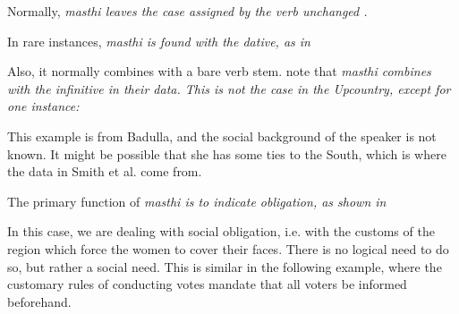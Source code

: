 Normally, \em masthi \em leaves the case assigned by the verb unchanged .


In rare instances, \em masthi \em is found with the dative, as in 



Also, it normally combines with a bare verb stem. \citet{SmithEtAl2004} note that \em masthi \em combines with the infinitive in their data. This is not the case in the Upcountry, except for one instance:


This example is from Badulla, and the social background of the speaker is not known. It might be possible that she has some ties to the South, which is where  the data in Smith et al. come from.

The primary function of \em masthi \em is to indicate obligation, as shown in 
 

In this case, we are dealing with social obligation, i.e. with the customs of the region which force the women to cover their faces. There is no logical need to do so, but rather a social need. This is similar in the following example, where the customary rules of conducting votes mandate that all voters be informed beforehand.

